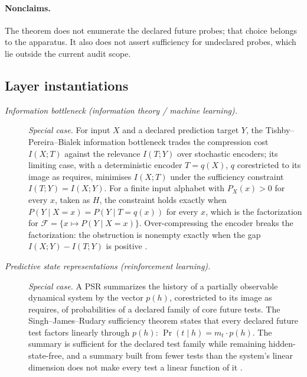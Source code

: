 \paragraph{Nonclaims.} The theorem does not enumerate the
declared future probes; that choice belongs to the apparatus.  It
also does not assert sufficiency for undeclared probes, which lie
outside the current audit scope.

\subsection*{Layer instantiations}\label{layer-inst:F7}

\begingroup\small
\begin{description}
\item[\emph{Information bottleneck (information theory / machine
learning).}] \textit{Special case.}
For input \(X\) and a declared prediction target \(Y\), the
Tishby--Pereira--Bialek information bottleneck trades the compression cost \(I(X;T)\) against the relevance
\(I(T;Y)\) over stochastic encoders; its limiting case, with a
deterministic encoder \(T=q(X)\), \(q\) corestricted to its image as  requires, minimises \(I(X;T)\) under the
sufficiency constraint \(I(T;Y)=I(X;Y)\).  For a finite input alphabet
with \(P_X(x)>0\) for every \(x\), taken as \(H\), the constraint holds exactly
when \(P(Y\mid X=x)=P(Y\mid T=q(x))\) for every \(x\), which is the 
factorization for \(\mathcal F=\{x\mapsto P(Y\mid X=x)\}\).  Over-compressing the
encoder breaks the factorization: the  obstruction is nonempty
exactly when the gap \(I(X;Y)-I(T;Y)\) is positive
\citep{TishbyPereiraBialek1999InformationBottleneck}.

\item[\emph{Predictive state representations (reinforcement
learning).}] \textit{Special case.}
A PSR summarizes the history of a partially observable dynamical
system by the vector \(p(h)\), corestricted to its image as  requires, of probabilities of a declared family of
core future tests.  The Singh--James--Rudary sufficiency theorem
states that every declared future test factors linearly through
\(p(h)\): \(\Pr(t\mid h)=m_t\cdot p(h)\).  The summary is sufficient
for the declared test family while remaining hidden-state-free, and a
summary built from fewer tests than the system's linear dimension does not make
every test a linear function of it
\citep{SinghJamesRudary2004PredictiveStateRepresentations}.


\end{description}
